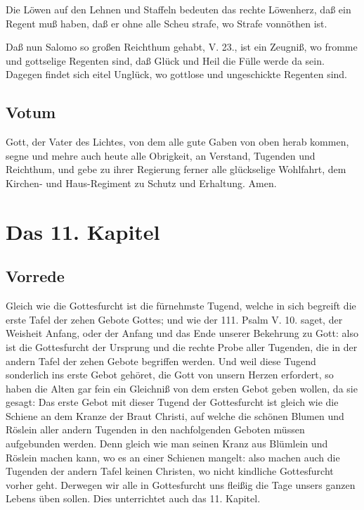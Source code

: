 Die Löwen auf den Lehnen und Staffeln bedeuten das rechte Löwenherz, daß ein Regent muß haben, daß er ohne alle Scheu strafe, wo Strafe vonnöthen ist.

Daß nun Salomo so großen Reichthum gehabt, V. 23., ist ein Zeugniß, wo fromme und gottselige Regenten sind, daß Glück und Heil die Fülle werde da sein. Dagegen findet sich eitel Unglück, wo gottlose und ungeschickte Regenten sind.

\section{Votum}

Gott, der Vater des Lichtes, von dem alle gute Gaben von oben herab kommen, segne und mehre auch heute alle Obrigkeit, an Verstand, Tugenden und Reichthum, und gebe zu ihrer Regierung ferner alle glückselige Wohlfahrt, dem Kirchen- und Haus-Regiment zu Schutz und Erhaltung. Amen.

\chapter{Das 11. Kapitel}

\section{Vorrede}

Gleich wie die Gottesfurcht ist die fürnehmste Tugend, welche in sich begreift die erste Tafel der zehen Gebote Gottes; und wie der 111. Psalm V. 10. saget, der Weisheit Anfang, oder der Anfang und das Ende unserer Bekehrung zu Gott: also ist die Gottesfurcht der Ursprung und die rechte Probe aller Tugenden, die in der andern Tafel der zehen Gebote begriffen werden. Und weil diese Tugend sonderlich ins erste Gebot gehöret, die Gott von unsern Herzen erfordert, so haben die Alten gar fein ein Gleichniß von dem ersten Gebot geben wollen, da sie gesagt: Das erste Gebot mit dieser Tugend der Gottesfurcht ist gleich wie die Schiene an dem Kranze der Braut Christi, auf welche die schönen Blumen und Röslein aller andern Tugenden in den nachfolgenden Geboten müssen aufgebunden werden. Denn gleich wie man seinen Kranz aus Blümlein und Röslein machen kann, wo es an einer Schienen mangelt: also machen auch die Tugenden der andern Tafel keinen Christen, wo nicht kindliche Gottesfurcht vorher geht. Derwegen wir alle in Gottesfurcht uns fleißig die Tage unsers ganzen Lebens üben sollen. Dies unterrichtet auch das 11. Kapitel.

